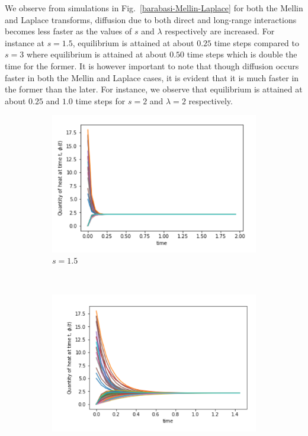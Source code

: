 \documentclass[10pt,a4paper]{article}
\theoremstyle{plain}
\theoremstyle{definition}
\begin{document}
       We observe from simulations in Fig.~\ref{barabasi-Mellin-Laplace} for both the Mellin and Laplace transforms, diffusion due to both direct and long-range interactions becomes less faster as the values of $s$ and $\lambda$ respectively are increased. For instance at $s=1.5$, equilibrium is attained at about $0.25$ time steps compared to $s=3$ where equilibrium is attained at about $0.50$ time steps which is double the time for the former. It is however important to note that though diffusion occurs faster in both the Mellin and Laplace cases, it is evident that it is much faster in the former than the later. For instance, we observe that equilibrium is attained at about $0.25$ and $1.0$ time steps for $s=2$ and $\lambda=2$ respectively.
        \begin{figure}[H]
        	\centering
        	\begin{subfigure}[b]{0.45\textwidth}
        		\includegraphics[width=\textwidth]{images/Erdos-Mellin15.png}
        		\caption{$s=1.5$}
        	\end{subfigure}~
        	\begin{subfigure}[b]{0.45\textwidth}
        		\includegraphics[width= \textwidth]{images/Erdos-Laplace15.png}

\end{subfigure}
\end{figure}
\end{document}
